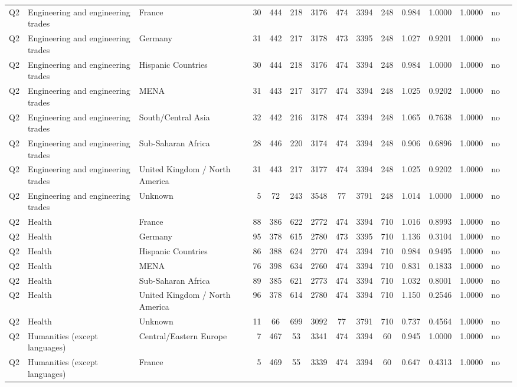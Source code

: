 \begin{longtable}{lllrcccccccccll}
Q2 & Engineering and engineering trades & France & 30 & 444 & 218 & 3176 & 474 & 3394 & 248 & 0.984 & 1.0000 & 1.0000 & no \\
Q2 & Engineering and engineering trades & Germany & 31 & 442 & 217 & 3178 & 473 & 3395 & 248 & 1.027 & 0.9201 & 1.0000 & no \\
Q2 & Engineering and engineering trades & Hispanic Countries & 30 & 444 & 218 & 3176 & 474 & 3394 & 248 & 0.984 & 1.0000 & 1.0000 & no \\
Q2 & Engineering and engineering trades & MENA & 31 & 443 & 217 & 3177 & 474 & 3394 & 248 & 1.025 & 0.9202 & 1.0000 & no \\
Q2 & Engineering and engineering trades & South/Central Asia & 32 & 442 & 216 & 3178 & 474 & 3394 & 248 & 1.065 & 0.7638 & 1.0000 & no \\
Q2 & Engineering and engineering trades & Sub-Saharan Africa & 28 & 446 & 220 & 3174 & 474 & 3394 & 248 & 0.906 & 0.6896 & 1.0000 & no \\
Q2 & Engineering and engineering trades & United Kingdom / North America & 31 & 443 & 217 & 3177 & 474 & 3394 & 248 & 1.025 & 0.9202 & 1.0000 & no \\
Q2 & Engineering and engineering trades & Unknown & 5 & 72 & 243 & 3548 & 77 & 3791 & 248 & 1.014 & 1.0000 & 1.0000 & no \\
Q2 & Health & France & 88 & 386 & 622 & 2772 & 474 & 3394 & 710 & 1.016 & 0.8993 & 1.0000 & no \\
Q2 & Health & Germany & 95 & 378 & 615 & 2780 & 473 & 3395 & 710 & 1.136 & 0.3104 & 1.0000 & no \\
Q2 & Health & Hispanic Countries & 86 & 388 & 624 & 2770 & 474 & 3394 & 710 & 0.984 & 0.9495 & 1.0000 & no \\
Q2 & Health & MENA & 76 & 398 & 634 & 2760 & 474 & 3394 & 710 & 0.831 & 0.1833 & 1.0000 & no \\
Q2 & Health & Sub-Saharan Africa & 89 & 385 & 621 & 2773 & 474 & 3394 & 710 & 1.032 & 0.8001 & 1.0000 & no \\
Q2 & Health & United Kingdom / North America & 96 & 378 & 614 & 2780 & 474 & 3394 & 710 & 1.150 & 0.2546 & 1.0000 & no \\
Q2 & Health & Unknown & 11 & 66 & 699 & 3092 & 77 & 3791 & 710 & 0.737 & 0.4564 & 1.0000 & no \\
Q2 & Humanities (except languages) & Central/Eastern Europe & 7 & 467 & 53 & 3341 & 474 & 3394 & 60 & 0.945 & 1.0000 & 1.0000 & no \\
Q2 & Humanities (except languages) & France & 5 & 469 & 55 & 3339 & 474 & 3394 & 60 & 0.647 & 0.4313 & 1.0000 & no \\

\end{longtable}
